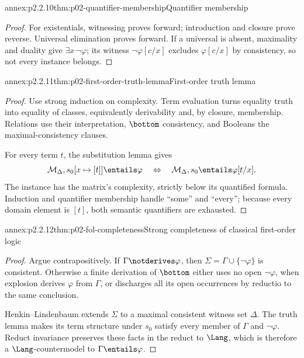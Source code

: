 \begin{annexitem}{annex:p2.2.10}{thm:p02-quantifier-membership}{Quantifier membership}
\begin{proof}
For existentials, witnessing proves forward; introduction and closure prove
reverse.  Universal elimination proves forward.  If a universal is absent,
maximality and duality give \(\exists x\,\neg\varphi\); its witness
\(\neg\varphi[c/x]\) excludes \(\varphi[c/x]\) by consistency, so not every
instance belongs.
\end{proof}
\end{annexitem}

\begin{annexitem}{annex:p2.2.11}{thm:p02-first-order-truth-lemma}{First-order truth lemma}
\begin{proof}
Use strong induction on complexity.  Term evaluation turns equality truth
into equality of classes, equivalently derivability and, by closure,
membership.  Relations use their interpretation, \(\bottom\) consistency,
and Booleans the maximal-consistency clauses.

For every term \(t\), the substitution lemma gives
\[
 \mathcal M_\Delta,s_0[x\mapsto[t]]\entails\varphi
 \quad\Leftrightarrow\quad
 \mathcal M_\Delta,s_0\entails\varphi[t/x].
\]
The instance has the matrix's complexity, strictly below its quantified
formula.  Induction and quantifier membership handle ``some'' and ``every'';
because every domain element is \([t]\), both semantic quantifiers are
exhausted.
\end{proof}
\end{annexitem}

\begin{annexitem}{annex:p2.2.12}{thm:p02-fol-completeness}{Strong completeness of classical first-order logic}
\begin{proof}
Argue contrapositively.  If \(\Gamma\notderives\varphi\), then
\(\Sigma=\Gamma\cup\{\neg\varphi\}\) is consistent.  Otherwise a finite
derivation of \(\bottom\) either uses no open \(\neg\varphi\), when
explosion derives \(\varphi\) from \(\Gamma\), or discharges all its open
occurrences by reductio to the same conclusion.

Henkin--Lindenbaum extends \(\Sigma\) to a maximal consistent witness set
\(\Delta\).  The truth lemma makes its term structure under \(s_0\) satisfy
every member of \(\Gamma\) and \(\neg\varphi\).  Reduct invariance preserves
these facts in the reduct to \(\Lang\), which is therefore a
\(\Lang\)-countermodel to \(\Gamma\entails\varphi\).
\end{proof}
\end{annexitem}

